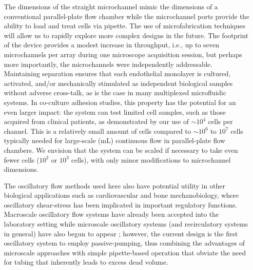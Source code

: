 The dimensions of the straight microchannel mimic the dimensions of a conventional parallel-plate flow chamber while the microchannel ports provide the ability to load and treat cells via pipette. The use of microfabrication techniques will allow us to rapidly explore more complex designs in the future. The footprint of the device provides a modest increase in throughput, i.e., up to seven microchannels per array during one microscope acquisition session, but perhaps more importantly, the microchannels were independently addressable. Maintaining separation ensures that each endothelial monolayer is cultured, activated, and\slash or mechanically stimulated as independent biological samples without adverse cross-talk, as is the case in many multiplexed microfluidic systems. In co-culture adhesion studies, this property has the potential for an even larger impact: the system can test limited cell samples, such as those acquired from clinical patients, as demonstrated by our use of $\sim 10^4$ cells per channel. This is a relatively small amount of cells compared to $\sim 10^6$ to $10^7$ cells typically needed for large-scale (mL) continuous flow in parallel-plate flow chambers. We envision that the system can be scaled if necessary to take even fewer cells ($10^2$ or $10^3$ cells), with only minor modifications to microchannel dimensions.

The oscillatory flow methods used here also have potential utility in other biological applications such as cardiovascular and bone mechanobiology, where oscillatory shear-stress has been implicated in important regulatory functions. Macroscale oscillatory flow systems have already been accepted into the laboratory setting while microscale oscillatory systems (and recirculatory systems in general) have also begun to appear \cite{Song:2005p157,Shao:2009p534}; however, the current design is the first oscillatory system to employ passive-pumping, thus combining the advantages of microscale approaches with simple pipette-based operation that obviate the need for tubing that inherently leads to excess dead volume.

